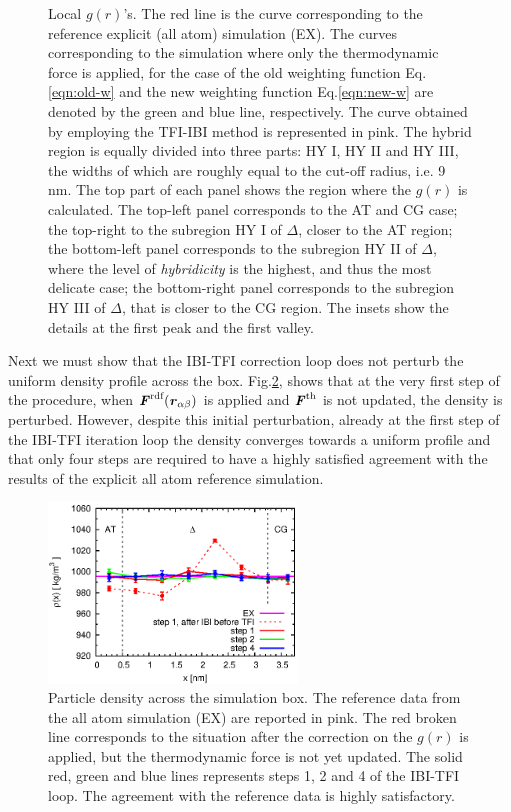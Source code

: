 \documentclass[aps,prb,preprint,citeautoscript]{revtex4}
\renewcommand{\v}[1]{\textbf{\textit{#1}}}
\begin{document}
\begin{figure}
  \caption{Local $g(r)$'s. The red line is the curve corresponding to the reference explicit (all atom)
    simulation (EX). The curves corresponding to the simulation where only the thermodynamic force is applied, for the case of  
    the old weighting function Eq.\eqref{eqn:old-w} and
    the new weighting function Eq.\eqref{eqn:new-w} are denoted by the
    green and blue line, respectively. The curve obtained by employing the TFI-IBI
    method is represented in pink.
The hybrid region is equally
    divided into three parts: HY I, HY II and HY III, the widths of
    which are roughly equal to the cut-off radius, i.e. 9 \textsf{nm}. 
The top part of each panel shows the region where the $g(r)$ is calculated.
The top-left panel corresponds to the AT and CG case; the top-right to the subregion HY I of $\Delta$, 
closer to the AT region; the bottom-left panel corresponds to the  subregion HY II of $\Delta$, where the level of {\it hybridicity} is the highest, and thus the most delicate case; the bottom-right panel corresponds to the  subregion HY III of $\Delta$, that is closer to the CG region. The insets show the details at the first peak and the first valley.}
  \label{fig:tmp7}
\end{figure}
Next we must show that the IBI-TFI correction loop does not perturb the uniform density profile across the box. Fig.\ref{rho}, shows that at the very first step of the procedure, when $\v F^{\textrm{rdf}}(\v r_{\alpha\beta})$ is applied and ${\v F}^{\textrm{th}}$ is not updated, the density is perturbed. However, despite this initial perturbation, already at the first step of the IBI-TFI iteration loop the density converges towards a uniform profile and that only four steps are required to have a highly satisfied agreement with the results of the explicit all atom reference simulation.
\begin{figure}
  \centering
  \includegraphics[width=0.59\textwidth]{rho.eps}
  \caption{Particle density across the simulation box. The reference data from the all atom simulation (EX) are reported in pink. The red broken line corresponds to the situation after the correction on the $g(r)$ is applied, but the thermodynamic force is not yet updated. The solid red, green and blue lines represents steps 1, 2 and 4 of the IBI-TFI loop. The agreement with the reference data is highly satisfactory.}
  \label{rho}
\end{figure}
\end{document}
